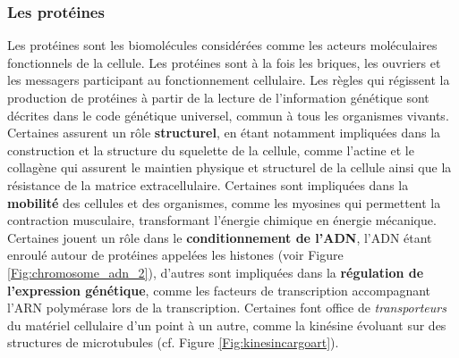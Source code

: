 \subsubsection{Les protéines}


Les protéines sont les biomolécules considérées comme les acteurs moléculaires fonctionnels de la cellule. Les protéines sont à la fois les briques, les ouvriers et les messagers participant au fonctionnement cellulaire. Les règles qui régissent la production de protéines à partir de la lecture de l'information génétique sont décrites dans le code génétique universel, commun à tous les organismes vivants. Certaines assurent un rôle \textbf{structurel}, en étant notamment impliquées dans la construction et la structure du squelette de la cellule, comme l'actine et le collagène qui assurent le maintien physique et structurel de la cellule ainsi que la résistance de la matrice extracellulaire. Certaines sont impliquées dans la \textbf{mobilité} des cellules et des organismes, comme les myosines qui permettent la contraction musculaire, transformant l'énergie chimique en énergie mécanique. Certaines jouent un rôle dans le \textbf{conditionnement de l'ADN}, l'ADN étant enroulé autour de protéines appelées les histones (voir Figure \ref{Fig:chromosome_adn_2}), d'autres sont impliquées dans la \textbf{régulation de l'expression génétique}, comme les facteurs de transcription accompagnant l'ARN polymérase lors de la transcription. Certaines font office de \textit{transporteurs} du matériel cellulaire d'un point à un autre, comme la kinésine évoluant sur des structures de microtubules (cf. Figure \ref{Fig:kinesincargoart}).

